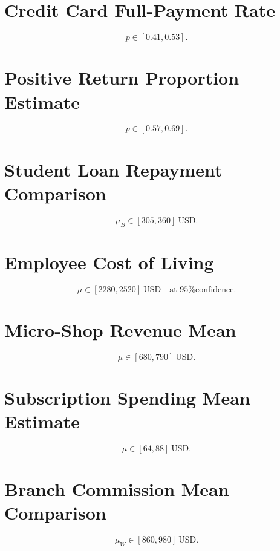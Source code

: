 \section*{Credit Card Full-Payment Rate}
\[p \in [0.41, 0.53].\]

\section*{Positive Return Proportion Estimate}
\[p \in [0.57, 0.69].\]

\section*{Student Loan Repayment Comparison}
\[\mu_B \in [305, 360]\ \text{USD}.\]

\section*{Employee Cost of Living}
\[\mu \in [2280, 2520]\ \text{USD} \quad \text{at 95\% confidence.}\]

\section*{Micro-Shop Revenue Mean}
\[\mu \in [680, 790]\ \text{USD}.\]

\section*{Subscription Spending Mean Estimate}
\[\mu \in [64, 88]\ \text{USD}.\]

\section*{Branch Commission Mean Comparison}
\[\mu_W \in [860, 980]\ \text{USD}.\]


